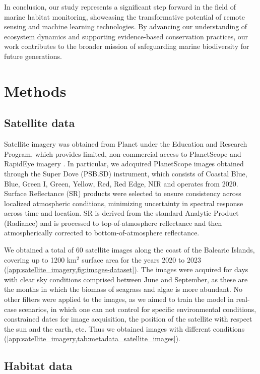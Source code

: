 In conclusion, our study represents a significant step forward in the field of
marine habitat monitoring, showcasing the transformative potential of remote
sensing and machine learning technologies. By advancing our understanding of
ecosystem dynamics and supporting evidence-based conservation practices, our
work contributes to the broader mission of safeguarding marine biodiversity for
future generations.

\section{Methods}

\subsection{Satellite data}

Satellite imagery was obtained from Planet under the Education and Research
Program, which provides limited, non-commercial access to PlanetScope and
RapidEye imagery \cite{planet2017}. In particular, we adcquired PlanetScope
images obtained through the Super Dove (PSB.SD) instrument, which consists of
Coastal Blue, Blue, Green I, Green, Yellow, Red, Red Edge, NIR and operates
from 2020. Surface Reflectance (SR) products were selected to ensure
consistency across localized atmospheric conditions, minimizing uncertainty in
spectral response across time and location. SR is derived from the standard
Analytic Product (Radiance) and is processed to top-of-atmosphere reflectance
and then atmospherically corrected to bottom-of-atmosphere reflectance.

We obtained a total of 60 satellite images along the coast of the Balearic
Islands, covering up to 1200 km$^2$ surface area for the years 2020 to 2023
(\cref{app:satellite_imagery,fig:images-dataset}). The images were
acquired for days with clear sky conditions comprised between June and
September, as these are the months in which the biomass of seagrass and algae
is more abundant. No other filters were applied to the images, as we aimed to
train the model in real-case scenarios, in which one can not control for
specific
environmental conditions, constrained dates for image acquisition, the position
of the satellite with respect the sun and the earth, etc. Thus we obtained
images with different conditions
(\cref{app:satellite_imagery,tab:metadata_satellite_images}).

\subsection{Habitat data}

